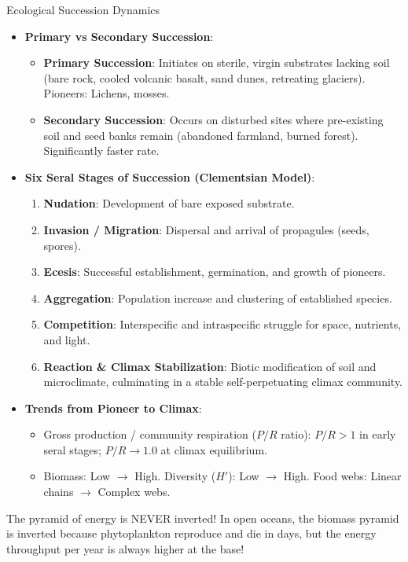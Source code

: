 \begin{formulabox}{Ecological Succession Dynamics}
\begin{itemize}[leftmargin=1.2em]
    \item \textbf{Primary vs Secondary Succession}:
    \begin{itemize}
        \item \textbf{Primary Succession}: Initiates on sterile, virgin substrates lacking soil (bare rock, cooled volcanic basalt, sand dunes, retreating glaciers). Pioneers: Lichens, mosses.
        \item \textbf{Secondary Succession}: Occurs on disturbed sites where pre-existing soil and seed banks remain (abandoned farmland, burned forest). Significantly faster rate.
    \end{itemize}
    \item \textbf{Six Seral Stages of Succession (Clementsian Model)}:
    \begin{enumerate}
        \item \textbf{Nudation}: Development of bare exposed substrate.
        \item \textbf{Invasion / Migration}: Dispersal and arrival of propagules (seeds, spores).
        \item \textbf{Ecesis}: Successful establishment, germination, and growth of pioneers.
        \item \textbf{Aggregation}: Population increase and clustering of established species.
        \item \textbf{Competition}: Interspecific and intraspecific struggle for space, nutrients, and light.
        \item \textbf{Reaction \& Climax Stabilization}: Biotic modification of soil and microclimate, culminating in a stable self-perpetuating climax community.
    \end{enumerate}
    \item \textbf{Trends from Pioneer to Climax}:
    \begin{itemize}
        \item Gross production / community respiration ($P/R$ ratio): $P/R > 1$ in early seral stages; $P/R \to 1.0$ at climax equilibrium.
        \item Biomass: Low $\to$ High. \quad Diversity ($H'$): Low $\to$ High. \quad Food webs: Linear chains $\to$ Complex webs.
    \end{itemize}
\end{itemize}
\end{formulabox}

\begin{memorytip}
The pyramid of energy is NEVER inverted! In open oceans, the biomass pyramid is inverted because phytoplankton reproduce and die in days, but the energy throughput per year is always higher at the base!
\end{memorytip}
